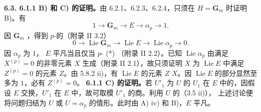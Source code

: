 \textbf{6.3. 6.1.1 B) 和 C) 的证明。}由 6.2.1、6.2.3、6.2.4，只须在 $H=\mathbf G_m$ 时证明 B)。有
\[1\longrightarrow\mathbf G_m\longrightarrow E\longrightarrow\alpha_p\longrightarrow1.\]
因 $\mathbf G_m$ ，得到 $p$-的（附录 II 3.2）
\[0\longrightarrow\operatorname{Lie}\mathbf G_m\longrightarrow\operatorname{Lie}E\longrightarrow\operatorname{Lie}\alpha_p\longrightarrow0.\tag{*}\]
因 $\alpha_p$ 为 $1$， $E$ 平凡当且仅当 $p$- (*) （附录 II 2.2）。已知 $\operatorname{Lie}\alpha_p$ 由满足 $X^{(p)}=0$ 的非零元素 $X$ 生成（附录 II 2.1），故只须证明 $X$ 为 $\operatorname{Lie}E$ 中满足 $Z^{(p)}=0$ 的元素 $Z$。由 5.8.2 ii)，有 $\operatorname{Lie}E$ 的元素 $Z$  $X$。因 $\operatorname{Lie}E$ 的部分显然至多为 $1$，必有 $Z^{(p)}=0$。
\textbf{6.1.1 C) 的证明。}若 $U'_1$ 为 $U$ 的 $U_1$ 在 $E$ 中的，因假设 $E$ 交换，$U'_1$ 在 $E$ 中，故可取模 $U'_1$ 的商。利用 $U$ 的（3.5 ii)），
上述讨论便将问题归结为 $U$ 或 $U=\alpha_p$ 的情形。此时由 A) iv) 和 B)，$E$ 平凡。

